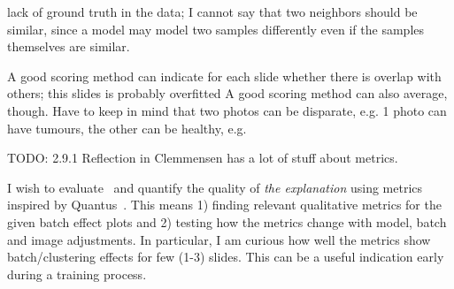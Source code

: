 \documentclass[10pt,twocolumn,letterpaper]{article}
\begin{document}
lack of ground truth in the data; I cannot say that two neighbors should be similar, since a model may model two samples differently even if the samples themselves are similar.

A good scoring method can indicate for each slide whether there is overlap with others; this slides is probably overfitted
A good scoring method can also average, though.
Have to keep in mind that two photos can be disparate, e.g. 1 photo can have tumours, the other can be healthy, e.g.

TODO: 2.9.1 Reflection in Clemmensen has a lot of stuff about metrics.


I wish to evaluate~\cite{sslUMAP} and quantify the quality of \textit{the explanation} using metrics inspired by Quantus~\cite{hedstrom2022quantus}. This means 1) finding relevant qualitative metrics for the given batch effect plots and 2) testing how the metrics change with model, batch and image adjustments. In particular, I am curious how well the metrics show batch/clustering effects for few (1-3) slides. This can be a useful indication early during a training process.

{\small


}
\end{document}

